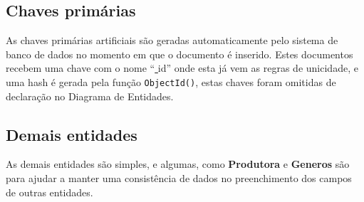\documentclass[
	12pt,				%
	openright,			%
	oneside,			%
	a4paper,			%
	english,			%
	french,				%
	spanish,			%
	brazil,				%
	]{abntex2}
\newcommand{\under}{\underline{ }}
\begin{document}
\subsection{Chaves primárias}
As chaves primárias artificiais são geradas automaticamente pelo sistema de banco de dados no momento em que o documento é inserido. Estes documentos recebem uma chave com o nome ``{\under}id'' onde esta já vem as regras de unicidade, e uma hash é gerada pela função \verb+ObjectId()+, estas chaves foram omitidas de declaração no Diagrama de Entidades.

\subsection{Demais entidades} 
As demais entidades são simples, e algumas, como \textbf{Produtora} e \textbf{Generos} são para ajudar a manter uma consistência de dados no preenchimento dos campos de outras entidades.

\end{document}
